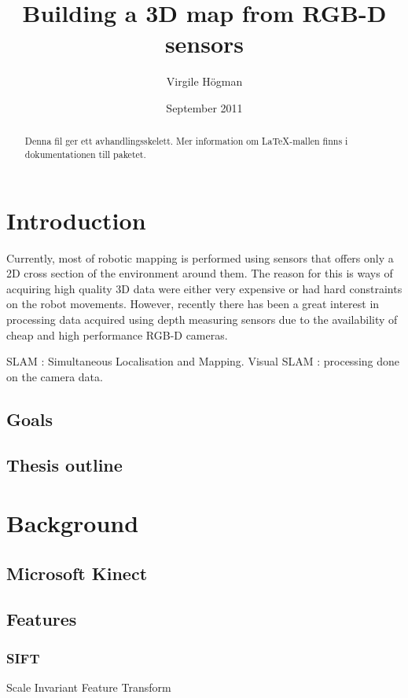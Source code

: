 \documentclass[a4paper,11pt]{kth-mag}
\title{Building a 3D map from RGB-D sensors}
\author{Virgile H\"{o}gman}
\date{September 2011}
\begin{document}
\frontmatter
\maketitle

\clearpage
{}
\begin{abstract}
  Denna fil ger ett avhandlingsskelett.
  Mer information om \LaTeX-mallen finns i
  dokumentationen till paketet.
\end{abstract}
\clearpage
\tableofcontents
\mainmatter
\chapter{Introduction}

Currently, most of robotic mapping is performed using sensors that offers only a 2D cross section of the environment around them. The reason for this is ways of acquiring high quality 3D data were either very expensive or had hard constraints on the robot movements. However, recently there has been a great interest in processing data acquired using depth measuring sensors due to the availability of cheap and high performance RGB-D cameras. 

SLAM : Simultaneous Localisation and Mapping.
Visual SLAM : processing done on the camera data.  

\section{Goals}

\section{Thesis outline}

\chapter{Background}

\section{Microsoft Kinect}

\section{Features}

\subsection{SIFT}
Scale Invariant Feature Transform
\end{document}
